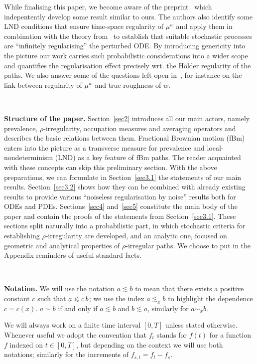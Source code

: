 \documentclass[10pt]{article}
\newcommand{\tmstrong}[1]{\textbf{#1}}
\newcommand{\tmtextbf}[1]{{\bfseries{#1}}}
\begin{document}
While finalising this paper, we become aware of the
preprint~{\cite{perkowski}} which indepentently develop some result similar to
ours. The authors also identify some LND conditions that ensure time-space
regularity of $\mu^w$ and apply them in combination with the theory
from~{\cite{catelliergubinelli}} to establish that suitable stochastic
processes are ``infinitely regularising'' the perturbed ODE. By introducing
genericity into the picture our work carries such probabilistic considerations
into a wider scope and quantifies the regularisation effect precisely wrt. the
H{\"o}lder regularity of the paths. We also answer some of the questions left
open in~{\cite{perkowski}}, for instance on the link between regularity of
$\mu^w$ and true roughness of $w$.

\

\tmtextbf{Structure of the paper.} Section~\ref{sec2} introduces all our main
actors, namely prevalence, $\rho$-irregularity, occupation measures and
averaging operators and describes the basic relations between them. Fractional
Brownian motion (fBm) enters into the picture as a transverse measure for
prevalence and local-nondeterminism (LND) as a key feature of fBm paths. The
reader acquainted with these concepts can skip this preliminary section. With
the above preparations, we can formulate in Section~\ref{sec3.1} the
statements of our main results. Section~\ref{sec3.2} shows how they can be
combined with already existing results to provide various ``noiseless
regularisation by noise'' results both for ODEs and PDEs. Sections~\ref{sec4}
and~\ref{sec5} constitute the main body of the paper and contain the proofs of
the statements from Section~\ref{sec3.1}. These sections split naturally into
a probabilistic part, in which stochastic criteria for establishing
$\rho$-irregularity are developed, and an analytic one, focused on geometric
and analytical properties of $\rho$-irregular paths. We choose to put in the
Appendix reminders of useful standard facts.

\

{\tmstrong{Notation.}} We will use the notation $a \lesssim b$ to mean that
there exists a positive constant $c$ such that $a \leqslant c \hspace{0.17em}
b$; we use the index $a \lesssim_x b$ to highlight the dependence $c = c (x)$.
$a \sim b$ if and only if $a \lesssim b$ and $b \lesssim a$, similarly for $a
\sim_x b$.

We will always work on a finite time interval $[0, T]$ unless stated
otherwise. Whenever useful we adopt the convention that $f_t$ stands for $f
(t)$ for a function $f$ indexed on $t \in [0, T]$, but depending on the
context we will use both notations; similarly for the increments of $f_{s, t}
= f_t - f_s$.
\end{document}
